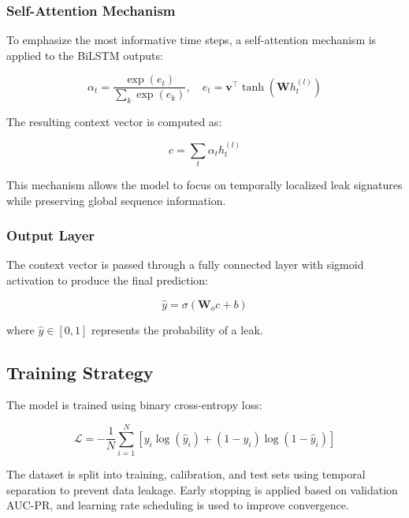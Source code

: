 \subsubsection{Self-Attention Mechanism}

To emphasize the most informative time steps, a self-attention mechanism is
applied to the BiLSTM outputs:

\begin{equation}
\alpha_t = \frac{\exp(e_t)}{\sum_{k} \exp(e_k)}, \quad
e_t = \mathbf{v}^\top \tanh(\mathbf{W} h^{(l)}_t)
\end{equation}

The resulting context vector is computed as:

\begin{equation}
c = \sum_t \alpha_t h^{(l)}_t
\end{equation}

This mechanism allows the model to focus on temporally localized leak signatures
while preserving global sequence information.

\subsubsection{Output Layer}

The context vector is passed through a fully connected layer with sigmoid
activation to produce the final prediction:

\begin{equation}
\hat{y} = \sigma(\mathbf{W}_o c + b)
\end{equation}

where $\hat{y} \in [0,1]$ represents the probability of a leak.

\subsection{Training Strategy}

The model is trained using binary cross-entropy loss:

\begin{equation}
\mathcal{L} = - \frac{1}{N} \sum_{i=1}^{N} \left[
y_i \log(\hat{y}_i) + (1 - y_i)\log(1 - \hat{y}_i)
\right]
\end{equation}

The dataset is split into training, calibration, and test sets using temporal
separation to prevent data leakage. Early stopping is applied based on
validation AUC-PR, and learning rate scheduling is used to improve convergence.

